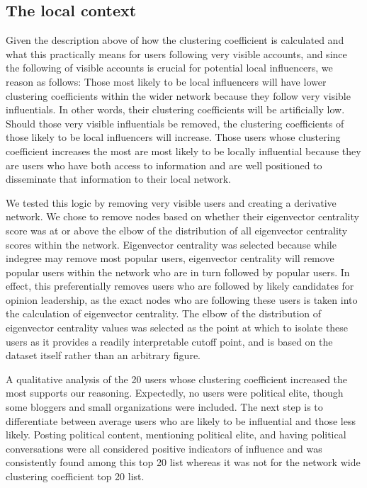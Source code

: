 \documentclass[a4paper,12pt]{article}
\begin{document}
\subsection{The local context}

Given the description above of how the clustering coefficient is calculated and what this practically means for users following very visible accounts, and since the following of visible accounts is crucial for potential local influencers, we reason as follows: Those most likely to be local influencers will have lower clustering coefficients within the wider network because they follow very visible influentials. In other words, their clustering coefficients will be artificially low. Should those very visible influentials be removed, the clustering coefficients of those likely to be local influencers will increase. Those users whose clustering coefficient increases the most are most likely to be locally influential because they are users who have both access to information and are well positioned to disseminate that information to their local network. 

We tested this logic by removing very visible users and creating a derivative network. We chose to remove nodes based on whether their eigenvector centrality score was at or above the elbow of the distribution of all eigenvector centrality scores within the network. Eigenvector centrality was selected because while indegree may remove most popular users, eigenvector centrality will remove popular users within the network who are in turn followed by popular users. In effect, this preferentially removes users who are followed by likely candidates for opinion leadership, as the exact nodes who are following these users is taken into the calculation of eigenvector centrality. The elbow of the distribution of eigenvector centrality values was selected as the point at which to isolate these users as it provides a readily interpretable cutoff point, and is based on the dataset itself rather than an arbitrary figure.

A qualitative analysis of the 20 users whose clustering coefficient increased the most supports our reasoning. Expectedly, no users were political elite, though some bloggers and small organizations were included. The next step is to differentiate between average users who are likely to be influential and those less likely. Posting political content, mentioning political elite, and having political conversations were all considered positive indicators of influence and was consistently found among this top 20 list whereas it was not for the network wide clustering coefficient top 20 list.
\end{document}
